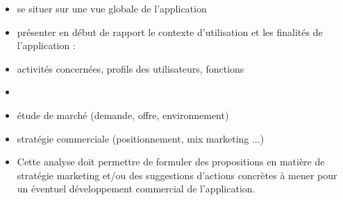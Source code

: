 \documentclass{article}
\begin{document}
	
	
	
	
	\tableofcontents
	
	\vspace{2cm}
		
	\begin{itemize}
		\item se situer sur une vue globale de l'application
		\item présenter en début de rapport le contexte d'utilisation et les finalités de l'application :
		\item activités concernées, profils des utilisateurs, fonctions
		\item
		\item étude de marché (demande, offre, environnement)
		\item stratégie commerciale (positionnement, mix marketing ...)
		\item Cette analyse doit permettre de formuler des propositions en matière de stratégie marketing et/ou des suggestions d'actions concrètes à mener pour un éventuel développement commercial de l'application.
	\end{itemize}
	
	\newpage
	
	
	
	
	
	
	
	


	


	


 

	


	
	
	
	
\end{document}

